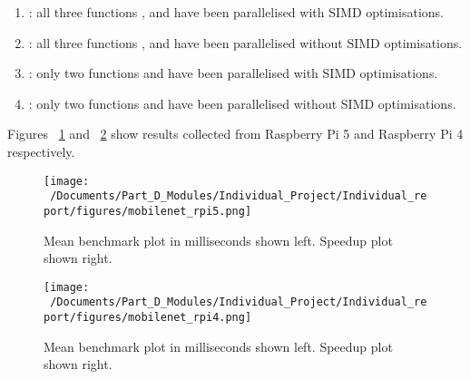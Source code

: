 \begin{enumerate}
	\item \texttt{}: all three functions \texttt{}, \texttt{} and \texttt{} have been parallelised with SIMD optimisations.
	\item \texttt{}: all three functions \texttt{}, \texttt{} and \texttt{} have been parallelised without SIMD optimisations.
	\item \texttt{}: only two functions \texttt{} and \texttt{} have been parallelised with SIMD optimisations.
	\item \texttt{}: only two functions \texttt{} and \texttt{} have been parallelised without SIMD optimisations.
\end{enumerate}

Figures ~\ref{fig:mobilenet_rpi5_plot} and ~\ref{fig:mobilenet_rpi4_plot} show results collected from Raspberry Pi 5 and Raspberry Pi 4 respectively. 

\begin{figure}[htbp] %
	\centering
	\texttt{[image: ~/Documents/Part\_D\_Modules/Individual\_Project/Individual\_report/figures/mobilenet\_rpi5.png]} %
	\caption{Mean benchmark plot in milliseconds shown left. Speedup plot shown right.}
	\label{fig:mobilenet_rpi5_plot} %
\end{figure}

\begin{figure}[htbp] %
	\centering
	\texttt{[image: ~/Documents/Part\_D\_Modules/Individual\_Project/Individual\_report/figures/mobilenet\_rpi4.png]} %
	\caption{Mean benchmark plot in milliseconds shown left. Speedup plot shown right.}
	\label{fig:mobilenet_rpi4_plot} %
\end{figure}

